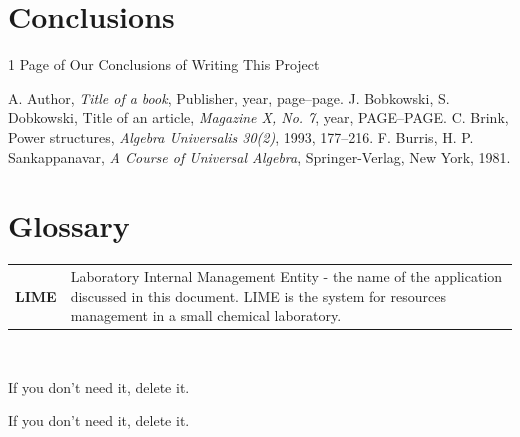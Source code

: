 \documentclass[a4paper,11pt,twoside]{report}
\theoremstyle{definition}
\begin{document}
\chapter*{Conclusions}

1 Page of Our Conclusions of Writing This Project
\thispagestyle{empty}






\begin{thebibliography}{20} %

 A. Author, \emph{Title of a book}, Publisher, year, page--page.
 J. Bobkowski, S. Dobkowski, Title of an article, \emph{Magazine X, No. 7}, year, PAGE--PAGE.
 C. Brink, Power structures, \emph{Algebra Universalis 30(2)}, 1993, 177--216.
 F. Burris, H. P. Sankappanavar, \emph{A Course of Universal Algebra}, Springer-Verlag, New York, 1981.
\end{thebibliography}
\thispagestyle{empty}



\chapter*{Glossary}
\begin{tabular}{cl}

\textbf{LIME} & Laboratory Internal Management Entity - the name of the application discussed in this document. LIME is the system for resources management in a small chemical laboratory. \\

\end{tabular}
\\

\thispagestyle{empty}


\listoffigures
\thispagestyle{empty}
If you don't need it, delete it.


\renewcommand{\listtablename}{List of tables}
\listoftables
\thispagestyle{empty}
If you don't need it, delete it.
\end{document}
